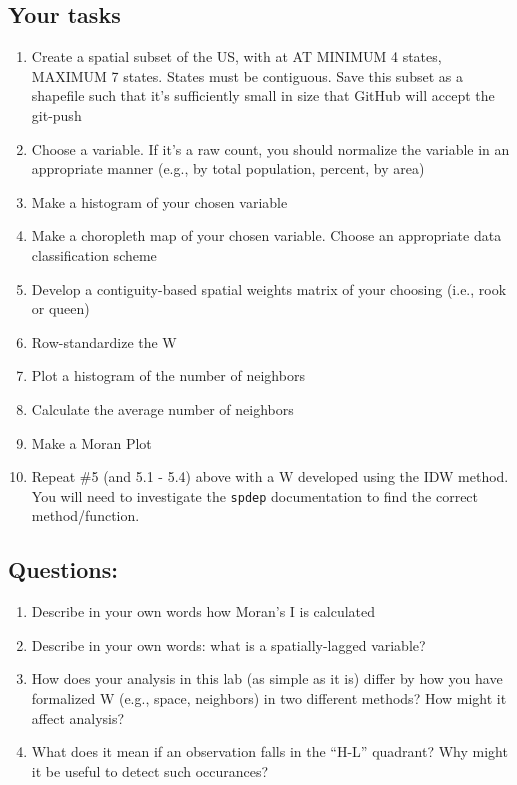 \documentclass[]{article}
\begin{document}
\subsection{Your tasks}\label{your-tasks}

\begin{enumerate}
\def\labelenumi{\arabic{enumi}.}
\item
  Create a spatial subset of the US, with at AT MINIMUM 4 states,
  MAXIMUM 7 states. States must be contiguous. Save this subset as a
  shapefile such that it's sufficiently small in size that GitHub will
  accept the git-push
\item
  Choose a variable. If it's a raw count, you should normalize the
  variable in an appropriate manner (e.g., by total population, percent,
  by area)
\item
  Make a histogram of your chosen variable
\item
  Make a choropleth map of your chosen variable. Choose an appropriate
  data classiﬁcation scheme
\item
  Develop a contiguity-based spatial weights matrix of your choosing
  (i.e., rook or queen)
\item
  Row-standardize the W
\item
  Plot a histogram of the number of neighbors
\item
  Calculate the average number of neighbors
\item
  Make a Moran Plot
\item
  Repeat \#5 (and 5.1 - 5.4) above with a W developed using the IDW
  method. You will need to investigate the \texttt{spdep} documentation
  to find the correct method/function.
\end{enumerate}

\subsection{Questions:}\label{questions}

\begin{enumerate}
\def\labelenumi{\arabic{enumi}.}
\item
  Describe in your own words how Moran's I is calculated
\item
  Describe in your own words: what is a spatially-lagged variable?
\item
  How does your analysis in this lab (as simple as it is) differ by how
  you have formalized W (e.g., space, neighbors) in two diﬀerent
  methods? How might it affect analysis?
\item
  What does it mean if an observation falls in the ``H-L'' quadrant? Why
  might it be useful to detect such occurances?
\end{enumerate}
\end{document}
